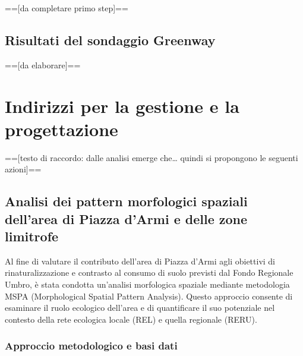 \documentclass[
  a4paper,
]{book}
\begin{document}
=={[}da completare primo step{]}==

\section{Risultati del sondaggio Greenway}\label{risultati-del-sondaggio-greenway}

=={[}da elaborare{]}==

\chapter{Indirizzi per la gestione e la progettazione}\label{indirizzi-per-la-gestione-e-la-progettazione}

=={[}testo di raccordo: dalle analisi emerge che\ldots{} quindi si propongono le seguenti azioni{]}==

\section{Analisi dei pattern morfologici spaziali dell'area di Piazza d'Armi e delle zone limitrofe}\label{analisi-dei-pattern-morfologici-spaziali-dellarea-di-piazza-darmi-e-delle-zone-limitrofe}

Al fine di valutare il contributo dell'area di Piazza d'Armi agli obiettivi di rinaturalizzazione e contrasto al consumo di suolo previsti dal Fondo Regionale Umbro, è stata condotta un'analisi morfologica spaziale mediante metodologia MSPA (Morphological Spatial Pattern Analysis). Questo approccio consente di esaminare il ruolo ecologico dell'area e di quantificare il suo potenziale nel contesto della rete ecologica locale (REL) e quella regionale (RERU).

\subsection{Approccio metodologico e basi dati}\label{approccio-metodologico-e-basi-dati-1}
\end{document}
